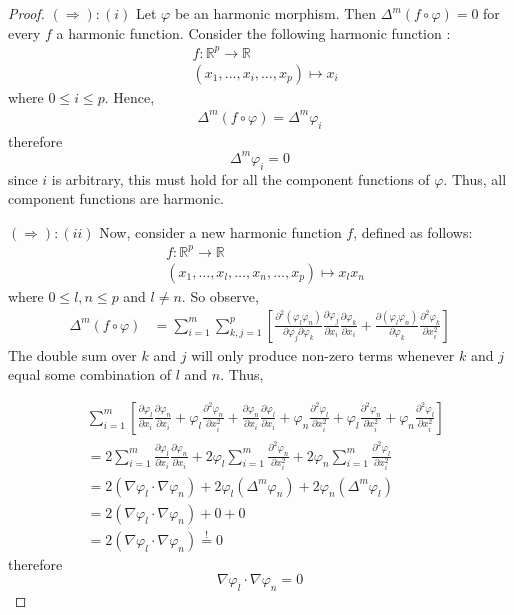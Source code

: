 \documentclass[12pt]{article}
\theoremstyle{definition}
\numberwithin{equation}{subsection}
\begin{document}
\begin{proof} $(\Rightarrow): (i)$ 
Let $\varphi$ be an harmonic morphism. Then  $\Delta^m(f\circ\varphi) = 0$ for every $f$ a harmonic function. Consider the following harmonic function :
\begin{align*}
&f: \mathbb{R}^p \rightarrow \mathbb{R} \\
&(x_1 , \ldots,x_i, \ldots, x_p) \mapsto x_i
\end{align*}
where $0\leq i \leq p$.
Hence,
\begin{align*}
\Delta^m(f\circ\varphi) = \Delta^m \varphi_i 
\end{align*}
therefore 
$$
\Delta^m \varphi_i =0
$$
since $i$ is arbitrary, this must hold for all the component functions of $\varphi$. Thus, all component functions are harmonic.

$(\Rightarrow): (ii)$
Now, consider a new harmonic function $f$, defined as follows:
\begin{align*}
&f: \mathbb{R}^p \rightarrow \mathbb{R} \\
&(x_1 , \ldots,x_l, \ldots, x_n, \ldots, x_p) \mapsto x_l x_n
\end{align*}
where $0 \leq l, n \leq p$ and $l \neq n$.
So observe,
\begin{align*}
\Delta^m(f\circ\varphi) &= \sum_{i =1}^{m} \sum_{k,j=1}^p  \left[ \frac{\partial^2  \left(\varphi_l \varphi_n\right)}{\partial \varphi_j \partial \varphi_k} \frac{\partial \varphi_j}{\partial x_i} \frac{\partial \varphi_k}{\partial x_i} + \frac{\partial(\varphi_l \varphi_n) }{\partial \varphi_k} \frac{\partial^2\varphi_k}{\partial x_i^2}  \right]
\end{align*}
The double sum over $k$ and $j$ will only produce non-zero terms whenever $k$ and $j$ equal some combination of $l$ and $n$. Thus,

\begin{align*}
&\sum_{i =1}^{m} \left[ \frac{\partial \varphi_l}{\partial x_i} \frac{\partial \varphi_n}{\partial x_i} + \varphi_l \frac{\partial^2\varphi_n}{\partial x_i^2} + \frac{\partial \varphi_n}{\partial x_i} \frac{\partial \varphi_l}{\partial x_i} + \varphi_n \frac{\partial^2\varphi_l}{\partial x_i^2} + \varphi_l \frac{\partial^2\varphi_n}{\partial x_i^2} + \varphi_n \frac{\partial^2\varphi_l}{\partial x_i^2} \right] \\
&= 2 \sum_{i =1}^{m} \frac{\partial \varphi_l}{\partial x_i} \frac{\partial \varphi_n}{\partial x_i} +  2\varphi_l \sum_{i =1}^{m}\frac{\partial^2\varphi_n}{\partial x_i^2} + 2\varphi_n \sum_{i =1}^{m}\frac{\partial^2\varphi_l}{\partial x_i^2} \\
&= 2 \left(\nabla\varphi_l \cdot \nabla\varphi_n \right) + 2 \varphi_l \left(\Delta^m \varphi_n \right) + 2 \varphi_n \left(\Delta^m \varphi_l \right) \\
&= 2 \left(\nabla\varphi_l \cdot \nabla\varphi_n \right) + 0 + 0 \\
&= 2 \left(\nabla\varphi_l \cdot \nabla\varphi_n \right) \overset{!}{=} 0
\end{align*}
therefore
$$
\nabla\varphi_l \cdot \nabla\varphi_n  = 0
$$


\end{proof}
\end{document}
